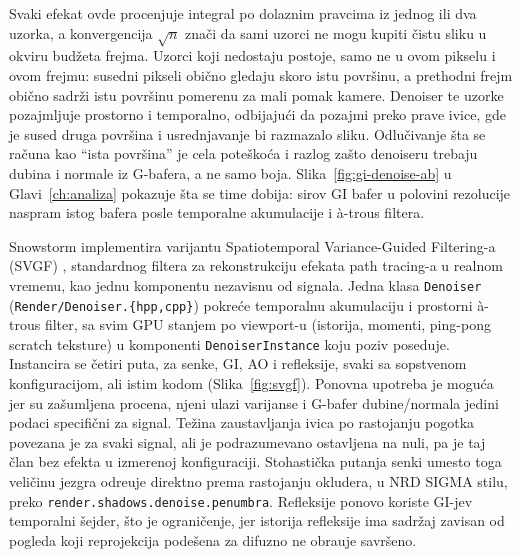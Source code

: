 Svaki efekat ovde procenjuje integral po dolaznim pravcima iz jednog ili dva uzorka, a konvergencija $\sqrt{n}$ zna\v{c}i da sami uzorci ne mogu kupiti \v{c}istu sliku u okviru bud\v{z}eta frejma. Uzorci koji nedostaju postoje, samo ne u ovom pikselu i ovom frejmu: susedni pikseli obi\v{c}no gledaju skoro istu povr\v{s}inu, a prethodni frejm obi\v{c}no sadr\v{z}i istu povr\v{s}inu pomerenu za mali pomak kamere. Denoiser te uzorke pozajmljuje prostorno i temporalno, odbijaju\'ci da pozajmi preko prave ivice, gde je sused druga povr\v{s}ina i usrednjavanje bi razmazalo sliku. Odlu\v{c}ivanje \v{s}ta se ra\v{c}una kao ``ista povr\v{s}ina'' je cela pote\v{s}ko\'ca i razlog za\v{s}to denoiseru trebaju dubina i normale iz G-bafera, a ne samo boja. Slika~\ref{fig:gi-denoise-ab} u Glavi~\ref{ch:analiza} pokazuje \v{s}ta se time dobija: sirov GI bafer u polovini rezolucije naspram istog bafera posle temporalne akumulacije i \`a-trous filtera.

Snowstorm implementira varijantu Spatiotemporal Variance-Guided Filtering-a (SVGF) \cite{schied2017svgf}, standardnog filtera za rekonstrukciju efekata path tracing-a u realnom vremenu, kao jednu komponentu nezavisnu od signala. Jedna klasa \texttt{Denoiser} (\texttt{Render/Denoiser.\{hpp,cpp\}}) pokre\'ce temporalnu akumulaciju i prostorni \`a-trous filter, sa svim GPU stanjem po viewport-u (istorija, momenti, ping-pong scratch teksture) u komponenti \texttt{DenoiserInstance} koju poziv poseduje. Instancira se \v{c}etiri puta, za senke, GI, AO i refleksije, svaki sa sopstvenom konfiguracijom, ali istim kodom (Slika~\ref{fig:svgf}). Ponovna upotreba je mogu\'ca jer su za\v{s}umljena procena, njeni ulazi varijanse i G-bafer dubine/normala jedini podaci specifi\v{c}ni za signal. Te\v{z}ina zaustavljanja ivica po rastojanju pogotka povezana je za svaki signal, ali je podrazumevano ostavljena na nuli, pa je taj \v{c}lan bez efekta u izmerenoj konfiguraciji. Stohasti\v{c}ka putanja senki umesto toga veli\v{c}inu jezgra odre\dj{}uje direktno prema rastojanju okludera, u NRD SIGMA stilu, preko \texttt{render.shadows.denoise.penumbra}. Refleksije ponovo koriste GI-jev temporalni \v{s}ejder, \v{s}to je ograni\v{c}enje, jer istorija refleksije ima sadr\v{z}aj zavisan od pogleda koji reprojekcija pode\v{s}ena za difuzno ne obra\dj{}uje savr\v{s}eno.

